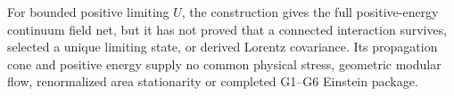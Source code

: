 For bounded positive limiting $U$, the construction gives the full
positive-energy continuum field net, but it has not proved that a connected
interaction survives, selected a unique limiting state, or derived Lorentz
covariance.  Its propagation cone and positive energy supply no common
physical stress, geometric modular flow, renormalized area stationarity
or completed G1--G6 Einstein package.

